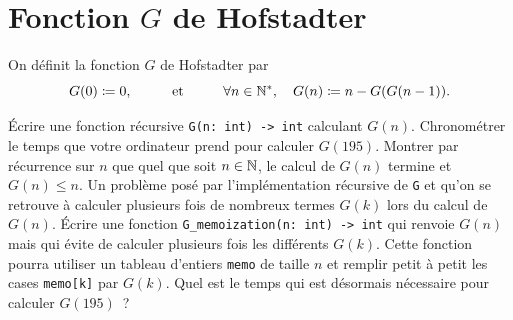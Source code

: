 \documentclass{magnolia}
\begin{document}
\section{Fonction $G$ de Hofstadter}
On définit la fonction $G$ de Hofstadter par
\[G(0)\coloneqq 0, \qquad\quad\!\text{et}\quad\!\qquad \forall n\in{\mathbb{N}^*},\quad G(n)\coloneqq n - G(G(n-1)).\]
\begin{questions}
\question Écrire une fonction récursive \verb!G(n: int) -> int! calculant $G(n)$.
\question Chronométrer le temps que votre ordinateur prend pour calculer $G(195)$.
\question Montrer par récurrence sur $n$ que quel que soit $n\in\mathbb{N}$, le calcul de $G(n)$ termine
  et $G(n)\leq n$.
\enonce Un problème posé par l'implémentation récursive de \verb!G! et qu'on se retrouve à calculer
  plusieurs fois de nombreux termes $G(k)$ lors du calcul de $G(n)$.
\question Écrire une fonction \verb!G_memoization(n: int) -> int!
  qui renvoie $G(n)$ mais qui évite de calculer plusieurs fois les différents $G(k)$. Cette fonction pourra
  utiliser un tableau d'entiers \verb!memo! de taille $n$ et remplir petit à petit les cases \verb!memo[k]!
  par $G(k)$.  Quel est le temps qui est désormais nécessaire pour calculer $G(195)$~?
\end{questions}
\end{document}
